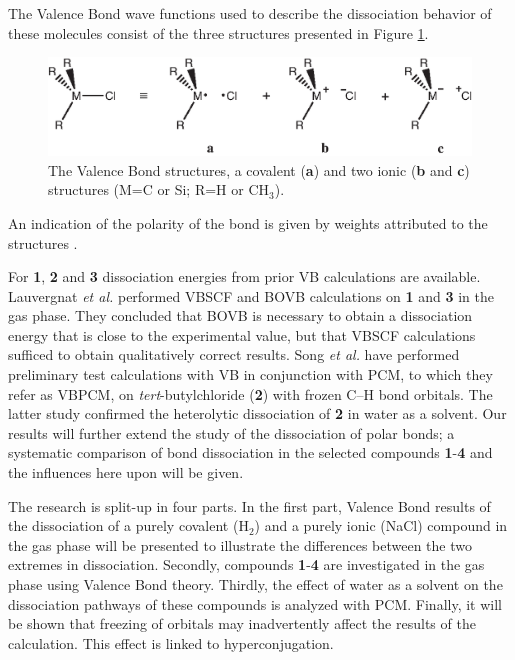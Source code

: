 The Valence Bond wave functions used to describe the dissociation behavior of these molecules consist of the three structures presented in Figure \ref{ch3.fig.structures}.
\begin{figure}[htbp]
\begin{center}
\includegraphics{dissociation/figures/structures.eps}
\end{center}
\caption{The Valence Bond structures, a covalent (\textbf{a}) and two ionic (\textbf{b} and \textbf{c}) structures (M=C or Si; R=H or CH$_3$).}
\label{ch3.fig.structures}
\end{figure}
An indication of the polarity of the bond is given by weights attributed to the structures \cite{coulson}. 

For \textbf{1}, \textbf{2} and \textbf{3} dissociation energies from prior VB calculations are available. Lauvergnat \textit{et al.} \cite{lauvergnat} performed VBSCF \cite{vbscf1,vbscf2} and BOVB \cite{bovb1,bovb2,bovb3} calculations on \textbf{1} and \textbf{3} in the gas phase. They concluded that BOVB is necessary to obtain a dissociation energy that is close to the experimental value, but that VBSCF calculations sufficed to obtain qualitatively correct results.  Song \textit{et al.} \cite{song} have performed preliminary test calculations with VB in conjunction with PCM, to which they refer as VBPCM, on \textit{tert}-butylchloride (\textbf{2}) with frozen C--H bond orbitals. The latter study confirmed the heterolytic dissociation of \textbf{2} in water as a solvent.  Our results will further extend the study of the dissociation of polar bonds; a systematic comparison of bond dissociation in the selected compounds \textbf{1}-\textbf{4} and the influences here upon will be given.

The research is split-up in four parts.  In the first part, Valence Bond results of the dissociation of a purely covalent (H$_2$) and a purely ionic (NaCl) compound in the gas phase will be presented to illustrate the differences between the two extremes in dissociation.
Secondly, compounds \textbf{1}-\textbf{4} are investigated in the gas phase using Valence Bond theory. Thirdly, the effect of water as a solvent on the dissociation pathways of these compounds is analyzed with PCM. Finally, it will be shown that freezing of orbitals may inadvertently affect the results of the calculation. This effect is linked to hyperconjugation.

